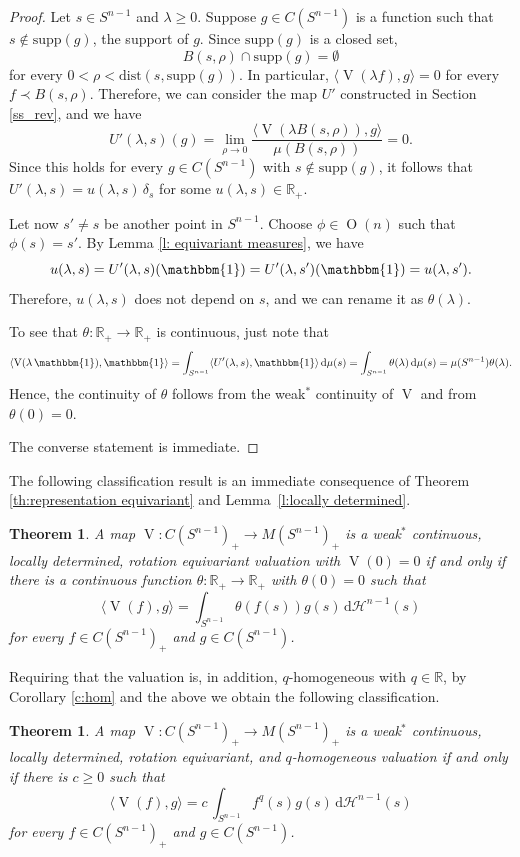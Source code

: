 \documentclass[11pt, a4paper]{amsart}
\newtheorem{theorem}[proposition]{Theorem}
\renewcommand{\d}{\,\mathrm{d}}
\newcommand{\supp}{\mbox{supp}}
\newcommand{\dist}{\mbox{dist}}
\newcommand{\uno}{\operatorname{\mathbbm{1}}}
\newcommand{\hn}{\mathcal H^{n-1}}
\newcommand{\rp}{\mathbb R_{\scriptscriptstyle +}}
\newcommand{\sn}{{S^{n-1}}}
\newcommand{\on}{\operatorname{O}(n)}
\renewcommand{\d}{\,\mathrm{d}}
\newcommand{\oV}{\operatorname{V}}
\newcommand{\measn}{M(\sn )_{\scriptscriptstyle +}}
\newcommand{\cfn}{C(\sn )_{\scriptscriptstyle +}}
\newcommand{\R}{\mathbb R}
\begin{document}
\begin{proof}
Let $s\in \sn $ and $\lambda\ge 0$. Suppose $g\in C(\sn )$  is a function such that $s\not \in \supp (g)$, the support of $g$. Since $\supp (g)$ is a closed set, 
$$
B(s, \rho)\cap \supp (g) = \emptyset
$$ 
for every $0<\rho<\dist(s, \supp (g))$. 
In particular, $\langle \oV(\lambda f),g\rangle=0$ for every $f\prec B(s,\rho)$. 
Therefore, we can consider the map $U'$ constructed in Section \ref{ss_rev}, and we have
$$
U'(\lambda, s)(g) = \lim_{\rho\rightarrow 0} \frac{\langle \oV(\lambda B(s,\rho)), g\rangle}{\mu(B(s,\rho))} = 0.
$$
Since this holds for every  $g\in C(\sn )$ with $s\not \in \supp (g)$, it follows that $U'(\lambda, s) = u(\lambda,s) \,\delta_s$ for some $u(\lambda,s)\in \rp$. 

Let now $s'\not = s$ be another point in $\sn $. Choose $\phi\in \on$ such that $\phi(s)=s'$. 
By Lemma \ref{l: equivariant measures}, we have $$u(\lambda, s) = U'(\lambda, s)(\uno) = U'(\lambda, s')(\uno)= u(\lambda, s').$$ Therefore, $u(\lambda, s)$ does not depend on $s$, and we can rename it as $\theta(\lambda)$. 

To see that $\theta\colon \rp\to\rp$ is continuous, just note  that
$$\langle \oV(\lambda \uno),\uno\rangle= \int_{\sn } \langle U'(\lambda, s),\uno\rangle \d\mu(s) = \int_{\sn } \theta(\lambda) \d\mu(s) =\mu(\sn) \theta(\lambda). $$ 
Hence, the continuity of $\theta$ follows from the weak$^*$ continuity of $\oV$ and from $\theta(0)=0$.

The converse statement is immediate. 
\end{proof}


The following classification result is an immediate consequence of Theorem \ref{th:representation equivariant} and Lemma~\ref{l:locally determined}. 

\begin{theorem}\label{t:orlicz} 
A map $\oV\colon  \cfn\to \measn$ is a weak$^*$\! continuous, locally determined, rotation equi\-variant valuation with $\oV(0)=0$ if and only if there is a continuous function $\theta\colon \rp\to\rp$ with $\theta(0)=0$ such that 
$$\langle \oV(f),g\rangle =\int_\sn \theta(f(s)) g(s) \d\hn(s)$$
for every $f\in\cfn$ and $g\in C(\sn)$.
\end{theorem}

\noindent
Requiring that the valuation is, in addition, $q$-homogeneous with $q\in\R$, by Corollary \ref{c:hom} and the above we obtain the following classification.

\begin{theorem}\label{t:characterization}
A map $\oV\colon  \cfn\to \measn$ is a weak$^*$\! continuous, locally determined, rotation equi\-variant, and $q$-homogeneous valuation if and only if there is $c\ge 0$ such that
$$\langle \oV(f),g\rangle =c\,\int_\sn f^q(s) g(s) \d\hn(s)$$
for every $f\in\cfn$ and $g\in C(\sn)$.
\end{theorem}
\end{document}
